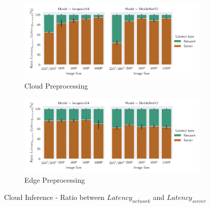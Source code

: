 \begin{figure}[H]
\centering
\begin{subfigure}[b]{0.95\textwidth}
   \includegraphics[width=1\linewidth]{./Bilder/single_plots/cloud_inference_plots/Cloud_ratio_server_total_latency_(cloud_prepro).pdf}
   \caption{Cloud Preprocessing}
   \label{fig:CloudInferenceratioCloudrel} 
\end{subfigure}

\begin{subfigure}[b]{0.95\textwidth}
   \includegraphics[width=1\linewidth]{./Bilder/single_plots/cloud_inference_plots/Cloud_ratio_server_total_latency_(edge_prepro).pdf}
   \caption{Edge Preprocessing}
   \label{fig:CloudInferenceRatioEdgerel}
\end{subfigure}

\caption{Cloud Inference -  Ratio between $Latency_{network}$ and $Latency_{server}$}
\end{figure}



